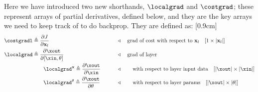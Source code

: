 
Here we have introduced two new shorthands, $\localgrad$ and $\costgrad$; these represent arrays of partial derivatives, defined below, and they are the key arrays we need to keep track of to do backprop. They are defined as:
[0.9cm]
\begin{align}
    \costgradl & \triangleq \frac{\partial J}{\partial \mathbf{x}_l}                                &  & \quad\quad \triangleleft \quad \text{grad of cost with respect to } \mathbf{x}_l \quad [1 \times |\mathbf{x}_l|] \\
    \localgrad & \triangleq \frac{\partial \xout}{\partial [\xin, \theta]}                          &  & \quad\quad \triangleleft \quad \text{grad of layer}                                                              \\
               & \quad\quad \localgrad^{\mathbf{x}} \triangleq \frac{\partial \xout}{\partial \xin} &  & \quad\quad \triangleleft \quad \text{\quad with respect to layer input data} \quad [|\xout| \times |\xin|]       \\
               & \quad\quad \localgrad^{\theta} \triangleq \frac{\partial \xout}{\partial \theta}   &  & \quad\quad \triangleleft \quad \text{\quad with respect to layer params} \quad [|\xout| \times |\theta|]
\end{align}

